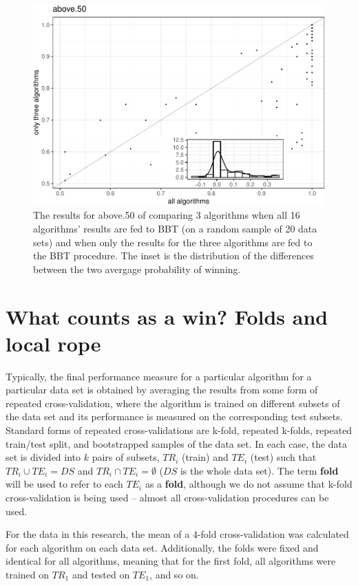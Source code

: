 \documentclass[twoside,11pt,preprint]{article}
\begin{document}
\begin{figure}
\includegraphics[width=0.7\linewidth]{figure-latex/fewmany3-1} \caption{\label{fig:fewmany3}The results for above.50 of comparing 3 algorithms when all 16 algorithms' results are fed to BBT (on a random sample of 20 data sets) and when only the results for the three algorithms are fed to the BBT procedure. The inset is the distribution of the differences between the two avergage probability of winning.}\label{fig:fewmany3}
\end{figure}

\hypertarget{what-counts-as-a-win-folds-and-local-rope}{%
\section{\texorpdfstring{What counts as a win? Folds and local rope \label{sec:lrope}}{What counts as a win? Folds and local rope }}\label{what-counts-as-a-win-folds-and-local-rope}}

Typically, the final performance measure for a particular algorithm for
a particular data set is obtained by averaging the results from some form of
repeated cross-validation, where the algorithm is trained on different
subsets of the data set and its performance is measured on the
corresponding test subsets. Standard forms of repeated
cross-validations are k-fold, repeated k-folds, repeated train/test
split, and bootstrapped samples of the data set. In each case, the data set is divided into \(k\) pairs of subsets, \(TR_i\) (train) and \(TE_i\) (test) such that
\(TR_i \cup TE_i = DS\) and \(TR_i \cap TE_i = \emptyset\) (\(DS\) is the
whole data set). The term \textbf{fold} will be used to refer to each \(TE_i\) as a \textbf{fold},
although we do not assume that k-fold cross-validation is being
used -- almost all cross-validation procedures can be used.

For the data in this research, the mean of a 4-fold cross-validation was calculated for each algorithm on each data set. Additionally, the folds were fixed and identical for all algorithms, meaning that for the first fold, all algorithms were trained on \(TR_1\) and tested on \(TE_1\), and so on.
\end{document}
